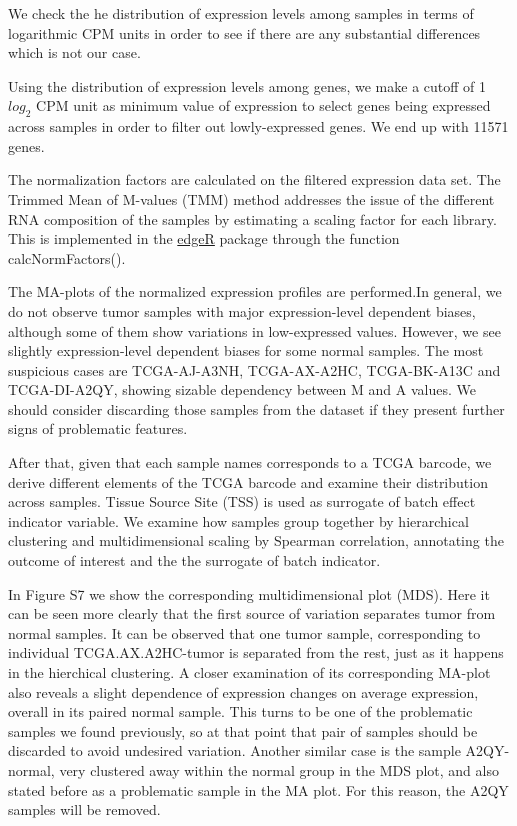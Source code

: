 \documentclass[9pt,twocolumn,twoside]{gsajnl}
\begin{document}
We check the he distribution of expression levels among samples in terms of logarithmic CPM units in order to see if there are any substantial differences which is not our case.

Using the distribution of expression levels among genes, we make a cutoff of 1 $log_{2}$ CPM unit as minimum value of expression to select genes being expressed across samples in order to filter out lowly-expressed genes. We end up with 11571 genes.


The normalization factors are calculated on the filtered expression data set. The Trimmed Mean of M-values (TMM) method addresses the issue of the different RNA composition of the samples by estimating a scaling factor for each library. This is implemented in the \href{http://bioconductor.org/packages/release/bioc/html/edgeR.html}{edgeR} package through the function calcNormFactors().

The MA-plots of the normalized expression profiles are performed.In general, we do not observe tumor samples with major expression-level dependent biases, although some of them show variations in low-expressed values. However, we see slightly expression-level dependent biases for some normal samples. The most suspicious cases are TCGA-AJ-A3NH, TCGA-AX-A2HC, TCGA-BK-A13C and TCGA-DI-A2QY, showing sizable dependency between M and A values. We should consider discarding those samples from the dataset if they present further signs of problematic features.


After that, given that each sample names corresponds to a TCGA barcode, we derive different elements of the TCGA barcode and examine their distribution across samples. Tissue Source Site (TSS) is used as surrogate of batch effect indicator variable. We examine how samples group together by hierarchical clustering and multidimensional scaling by Spearman correlation, annotating the outcome of interest and the the surrogate of batch indicator.

In Figure S7 we show the corresponding multidimensional plot (MDS). Here it can be seen more clearly that the first source of variation separates tumor from normal samples. It can be observed that one tumor sample, corresponding to individual TCGA.AX.A2HC-tumor is separated from the rest, just as it happens in the hierchical clustering. A closer examination of its corresponding MA-plot also reveals a slight dependence of expression changes on average expression, overall in its paired normal sample. This turns to be one of the problematic samples we found previously, so at that point that pair of samples should be discarded to avoid undesired variation. Another similar case is the sample A2QY-normal, very clustered away within the normal group in the MDS plot, and also stated before as a problematic sample in the MA plot. For this reason, the A2QY samples will be removed.
\end{document}
